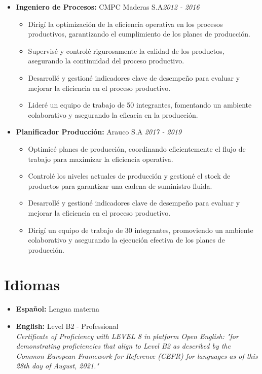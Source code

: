 \documentclass[a4paper,10pt]{article}
\begin{document}
\begin{itemize}[left=0pt]
			\item \textbf{\large Ingeniero de Procesos:}  CMPC Maderas S.A\hfill \textit{2012 - 2016} 
			\begin{itemize}[left=10pt, topsep=0pt]
				\item Dirigí la optimización de la eficiencia operativa en los procesos productivos, garantizando el cumplimiento de los planes de producción.
				\item Supervisé y controlé rigurosamente la calidad de los productos, asegurando la continuidad del proceso productivo.
				\item Desarrollé y gestioné indicadores clave de desempeño para evaluar y mejorar la eficiencia en el proceso productivo.
				\item Lideré un equipo de trabajo de 50 integrantes, fomentando un ambiente colaborativo y asegurando la eficacia en la producción.
			\end{itemize}
		
			\item \textbf{\large Planificador Producción:} Arauco S.A \hfill \textit{2017 - 2019} 
			\begin{itemize}[left=10pt, topsep=0pt]
				  \item Optimicé planes de producción, coordinando eficientemente el flujo de trabajo para maximizar la eficiencia operativa.
				\item Controlé los niveles actuales de producción y gestioné el stock de productos para garantizar una cadena de suministro fluida.
				\item Desarrollé y gestioné indicadores clave de desempeño para evaluar y mejorar la eficiencia en el proceso productivo.
				\item Dirigí un equipo de trabajo de 30 integrantes, promoviendo un ambiente colaborativo y asegurando la ejecución efectiva de los planes de producción.
			\end{itemize}
		\end{itemize}

	
	\section*{Idiomas}
		\begin{itemize}
		\item \textbf{Español:} Lengua materna
		\item \textbf{English:} Level B2 - Professional\\
		\textit{Certificate of Proficiency with LEVEL 8 in platform Open English: "for demonstrating proficiencies that align to Level B2 as described by the Common European Framework for Reference (CEFR) for languages as of this 28th day of August, 2021."}
		
	\end{itemize}
	
	
\end{document}
